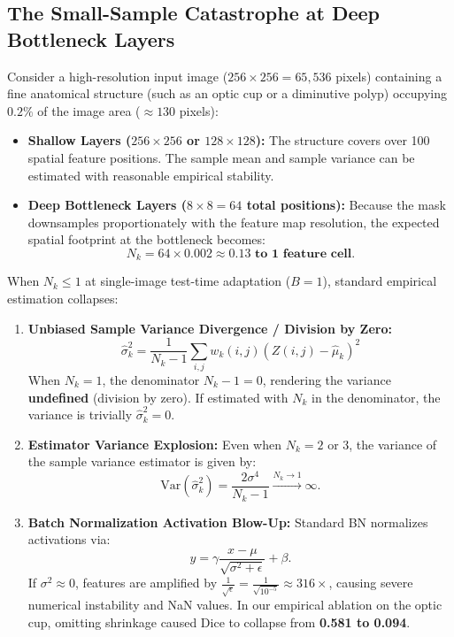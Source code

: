 \documentclass[11pt,a4paper]{article}
\begin{document}
\subsection{The Small-Sample Catastrophe at Deep Bottleneck Layers}
Consider a high-resolution input image ($256 \times 256 = 65{,}536$ pixels) containing a fine anatomical structure (such as an optic cup or a diminutive polyp) occupying $0.2\%$ of the image area ($\approx 130$ pixels):
\begin{itemize}
    \item \textbf{Shallow Layers ($256 \times 256$ or $128 \times 128$):} The structure covers over 100 spatial feature positions. The sample mean and sample variance can be estimated with reasonable empirical stability.
    \item \textbf{Deep Bottleneck Layers ($8 \times 8 = 64$ total positions):} Because the mask downsamples proportionately with the feature map resolution, the expected spatial footprint at the bottleneck becomes:
    \begin{equation}
        N_k = 64 \times 0.002 \approx \mathbf{0.13 \text{ to } 1 \text{ feature cell}}.
    \end{equation}
\end{itemize}

When $N_k \le 1$ at single-image test-time adaptation ($B=1$), standard empirical estimation collapses:
\begin{enumerate}
    \item \textbf{Unbiased Sample Variance Divergence / Division by Zero:}
    \begin{equation}
        \hat{\sigma}^2_k = \frac{1}{N_k - 1} \sum_{i,j} w_k(i,j)\left(Z(i,j) - \hat{\mu}_k\right)^2
    \end{equation}
    When $N_k = 1$, the denominator $N_k - 1 = 0$, rendering the variance \textbf{undefined} (division by zero). If estimated with $N_k$ in the denominator, the variance is trivially $\hat{\sigma}^2_k = 0$.
    \item \textbf{Estimator Variance Explosion:} Even when $N_k = 2$ or $3$, the variance of the sample variance estimator is given by:
    \begin{equation}
        \mathrm{Var}(\hat{\sigma}^2_k) = \frac{2\sigma^4}{N_k - 1} \xrightarrow{N_k \to 1} \infty.
    \end{equation}
    \item \textbf{Batch Normalization Activation Blow-Up:} Standard BN normalizes activations via:
    \begin{equation}
        y = \gamma \frac{x - \mu}{\sqrt{\sigma^2 + \epsilon}} + \beta.
    \end{equation}
    If $\sigma^2 \approx 0$, features are amplified by $\frac{1}{\sqrt{\epsilon}} = \frac{1}{\sqrt{10^{-5}}} \approx 316\times$, causing severe numerical instability and NaN values. In our empirical ablation on the optic cup, omitting shrinkage caused Dice to collapse from \textbf{0.581 to 0.094}.
\end{enumerate}
\end{document}

